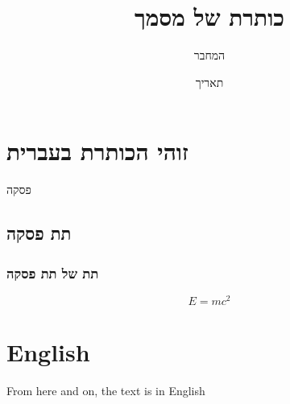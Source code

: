 \documentclass{article}
\title{כותרת של מסמך}
\author{המחבר}
\date{תאריך}
\begin{document}
\maketitle



\section{זוהי הכותרת בעברית}
פסקה

\subsection{תת פסקה}
\subsubsection{תת של תת פסקה}


\begin{equation}\label{eq:visc}
E = mc^2
\end{equation}

\section{English}

From here and on, the text is in English
\end{document}
